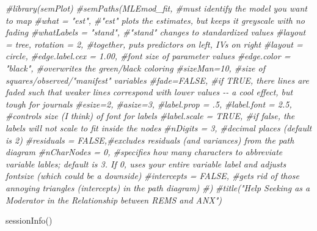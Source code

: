 \documentclass[
]{book}
\newenvironment{Shaded}{\begin{snugshade}}{\end{snugshade}}
\newcommand{\CommentTok}[1]{\textcolor[rgb]{0.56,0.35,0.01}{\textit{#1}}}
\newcommand{\FunctionTok}[1]{\textcolor[rgb]{0.00,0.00,0.00}{#1}}
\newcommand{\NormalTok}[1]{#1}
\begin{document}
\begin{Shaded}
\begin{Highlighting}[]
\CommentTok{\#library(semPlot)}
\CommentTok{\#semPaths(MLEmod\_fit, \#must identify the model you want to map}
        \CommentTok{\#what = "est", \#"est" plots the estimates, but keeps it greyscale with no fading}
         \CommentTok{\#whatLabels = "stand", \#"stand" changes to standardized values}
         \CommentTok{\#layout = \textquotesingle{}tree\textquotesingle{}, rotation = 2, \#together, puts predictors on left, IVs on right }
         \CommentTok{\#layout = \textquotesingle{}circle\textquotesingle{},}
         \CommentTok{\#edge.label.cex = 1.00, \#font size of parameter values}
         \CommentTok{\#edge.color = "black", \#overwrites the green/black coloring}
         \CommentTok{\#sizeMan=10, \#size of squares/observed/"manifest" variables}
         \CommentTok{\#fade=FALSE, \#if TRUE, there lines are faded such that weaker lines correspond with lower values {-}{-} a cool effect, but tough for journals}
         \CommentTok{\#esize=2, }
         \CommentTok{\#asize=3,}
         \CommentTok{\#label.prop = .5,}
         \CommentTok{\#label.font = 2.5, \#controls size (I think) of font for labels}
         \CommentTok{\#label.scale = TRUE, \#if false, the labels will not scale to fit inside the nodes}
         \CommentTok{\#nDigits = 3, \#decimal places (default is 2)}
         \CommentTok{\#residuals = FALSE,\#excludes residuals (and variances) from the path diagram}
         \CommentTok{\#nCharNodes = 0, \#specifies how many characters to abbreviate variable lables; default is 3.  If 0, uses your entire variable label and adjusts fontsize (which could be a downside)}
         \CommentTok{\#intercepts = FALSE, \#gets rid of those annoying triangles (intercepts) in the path diagram)}
\CommentTok{\#)}
\CommentTok{\#title("Help Seeking as a Moderator in the Relationship between REMS and ANX")}
\end{Highlighting}
\end{Shaded}

\begin{Shaded}
\begin{Highlighting}[]
\FunctionTok{sessionInfo}\NormalTok{()}
\end{Highlighting}
\end{Shaded}
\end{document}
